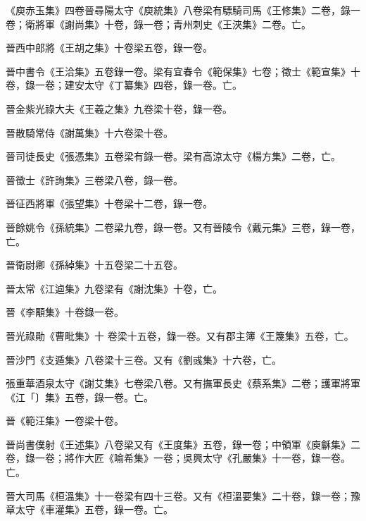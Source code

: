 \begin{pinyinscope}
 《庾赤玉集》四卷晉尋陽太守《庾統集》八卷梁有驃騎司馬《王修集》二卷，錄一卷；衛將軍《謝尚集》十卷，錄一卷；青州刺史《王浹集》二卷。亡。



 晉西中郎將《王胡之集》十卷梁五卷，錄一卷。



 晉中書令《王洽集》五卷錄一卷。梁有宜春令《範保集》七卷；徵士《範宣集》十卷，錄一卷；建安太守《丁纂集》四卷，錄一卷。亡。



 晉金紫光祿大夫《王羲之集》九卷梁十卷，錄一卷。



 晉散騎常侍《謝萬集》十六卷梁十卷。



 晉司徒長史《張憑集》五卷梁有錄一卷。梁有高涼太守《楊方集》二卷，亡。



 晉徵士《許詢集》三卷梁八卷，錄一卷。



 晉征西將軍《張望集》十卷梁十二卷，錄一卷。



 晉餘姚令《孫統集》二卷梁九卷，錄一卷。又有晉陵令《戴元集》三卷，錄一卷，亡。



 晉衛尉卿《孫綽集》十五卷梁二十五卷。



 晉太常《江逌集》九卷梁有《謝沈集》十卷，亡。



 晉《李顒集》十卷錄一卷。



 晉光祿勛《曹毗集》十
 卷梁十五卷，錄一卷。又有郡主簿《王篾集》五卷，亡。



 晉沙門《支遁集》八卷梁十三卷。又有《劉彧集》十六卷，亡。



 張重華酒泉太守《謝艾集》七卷梁八卷。又有撫軍長史《蔡系集》二卷；護軍將軍《江「〕集》五卷，錄一卷。亡。



 晉《範汪集》一卷梁十卷。



 晉尚書僕射《王述集》八卷梁又有《王度集》五卷，錄一卷；中領軍《庾龢集》二卷，錄一卷；將作大匠《喻希集》一卷；吳興太守《孔嚴集》十一卷，錄一卷。亡。



 晉大司馬《桓溫集》十一卷梁有四十三卷。又有《桓溫要集》二十卷，錄一卷；豫章太守《車灌集》五卷，錄一卷。亡。




\end{pinyinscope}
